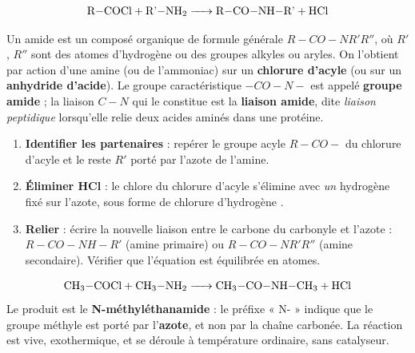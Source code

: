 \documentclass[11pt]{article}
\newcommand{\cle}[1]{{\popxbold\color{popdark}#1}}
\begin{document}
\[ \ce{\text{R}-COCl + \text{R'}-NH2 -> \text{R}-CO-NH-\text{R'} + HCl} \]

\begin{definition}[Amide]
Un \cle{amide} est un composé organique de formule générale $R-CO-NR'R''$, où $R'$, $R''$ sont des atomes d'hydrogène ou des groupes alkyles ou aryles. On l'obtient par action d'une amine (ou de l'ammoniac) sur un \textbf{chlorure d'acyle} (ou sur un \textbf{anhydride d'acide}). Le groupe caractéristique $-CO-N-$ est appelé \textbf{groupe amide} ; la liaison $C-N$ qui le constitue est la \textbf{liaison amide}, dite \emph{liaison peptidique} lorsqu'elle relie deux acides aminés dans une protéine.
\end{definition}

\begin{methode}
\begin{enumerate}
\item \textbf{Identifier les partenaires} : repérer le groupe acyle $R-CO-$ du chlorure d'acyle et le reste $R'$ porté par l'azote de l'amine.
\item \textbf{Éliminer HCl} : le chlore du chlorure d'acyle s'élimine avec \emph{un} hydrogène fixé sur l'azote, sous forme de chlorure d'hydrogène .
\item \textbf{Relier} : écrire la nouvelle liaison entre le carbone du carbonyle et l'azote : $R-CO-NH-R'$ (amine primaire) ou $R-CO-NR'R''$ (amine secondaire). Vérifier que l'équation est équilibrée en atomes.
\end{enumerate}
\end{methode}

\begin{exemplebox}
\[ \ce{CH3-COCl + CH3-NH2 -> CH3-CO-NH-CH3 + HCl} \]
Le produit est le \textbf{N-méthyléthanamide} : le préfixe « N- » indique que le groupe méthyle est porté par l'\textbf{azote}, et non par la chaîne carbonée. La réaction est vive, exothermique, et se déroule à température ordinaire, sans catalyseur.
\end{exemplebox}
\end{document}
